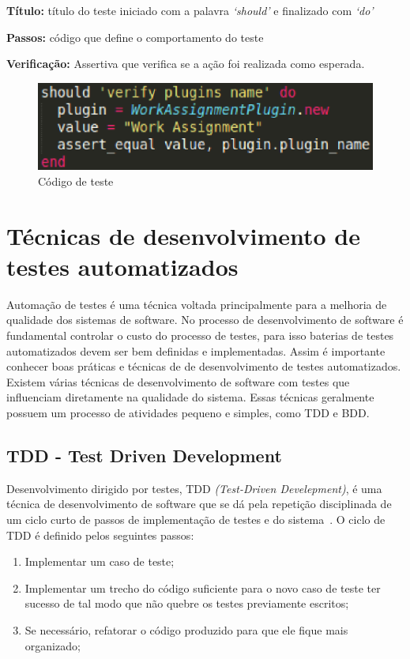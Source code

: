 \textbf{Título:} título do teste iniciado com a palavra \textit{‘should’} e finalizado com \textit{‘do’}

\textbf{Passos:} código que define o comportamento do teste

\textbf{Verificação:} Assertiva que verifica se a ação foi realizada como esperada.

\begin{figure}[!h]
    \centering
    \includegraphics[keepaspectratio=true,scale=0.55]
      {figuras/teste_should.eps}
    \caption{Código de teste}
    \label{noosfero_should}
\end{figure}

\section{Técnicas de desenvolvimento de testes automatizados}

Automação de testes é uma técnica voltada principalmente para a melhoria de 
qualidade dos sistemas de software. 
%
No processo de desenvolvimento de software é fundamental controlar o custo do 
processo de testes, para isso baterias de testes automatizados devem ser bem 
definidas e implementadas. Assim é importante conhecer boas práticas e técnicas 
de de desenvolvimento de testes automatizados.    
%
Existem várias técnicas de desenvolvimento de software com testes que influenciam 
diretamente na qualidade do sistema. Essas técnicas geralmente possuem um processo 
de atividades pequeno e simples, como TDD e BDD.

\subsection{TDD - Test Driven Development}

Desenvolvimento dirigido por testes, TDD \textit{(Test-Driven Develepment)}, 
é uma técnica de desenvolvimento de software que se dá pela repetição disciplinada 
de um ciclo curto de passos de implementação de testes e do sistema~\cite{koskela2007}.
%
O ciclo de TDD é definido pelos seguintes passos:
%
\begin{enumerate}
\item Implementar um caso de teste;
\item Implementar um trecho do código suficiente para o novo caso de teste ter sucesso 
de tal modo que não quebre os testes previamente escritos;
\item Se necessário, refatorar o código produzido para que ele fique mais organizado;
\end{enumerate}

